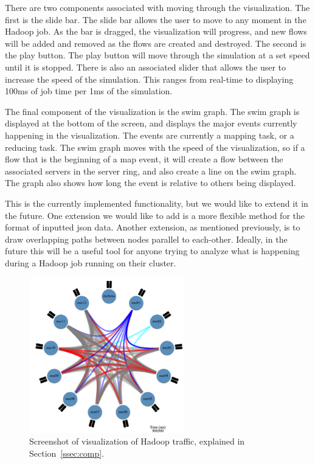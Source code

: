 There are two components associated with moving through the
visualization. The first is the slide bar. The slide bar allows the
user to move to any moment in the Hadoop job. As the bar is dragged,
the visualization will progress, and new flows will be added and
removed as the flows are created and destroyed. The second is the play
button. The play button will move through the simulation at a set
speed until it is stopped. There is also an associated slider that
allows the user to increase the speed of the simulation. This ranges
from real-time to displaying 100ms of job time per 1ms of the
simulation.

The final component of the visualization is the swim graph. The swim
graph is displayed at the bottom of the screen, and displays the major
events currently happening in the visualization. The events are
currently a mapping task, or a reducing task. The swim graph moves
with the speed of the visualization, so if a flow that is the
beginning of a map event, it will create a flow between the associated
servers in the server ring, and also create a line on the swim graph.
The graph also shows how long the event is relative to others being
displayed.

This is the currently implemented functionality, but we would like to
extend it in the future. One extension we would like to add is a more
flexible method for the format of inputted json data. Another
extension, as mentioned previously, is to draw overlapping paths
between nodes parallel to each-other. Ideally, in the future this will
be a useful tool for anyone trying to analyze what is happening during
a Hadoop job running on their cluster.

\begin{figure}
\centering
\includegraphics[width=0.6\textwidth]{figures/hadoop-viz.png}
\caption{Screenshot of visualization of Hadoop traffic, explained in Section~\ref{ssec:comp}.}
\label{fig:viz}
\end{figure}
